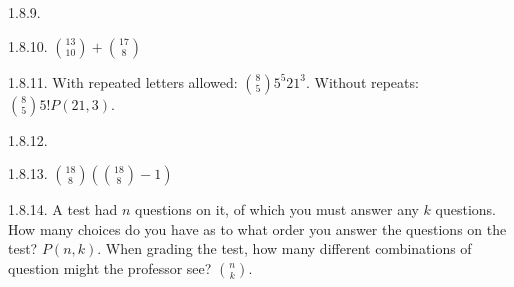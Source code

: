 \begin {itemize}
\begin{ans}{1.8.9.}
	
\end{ans}
\begin{ans}{1.8.10.}
		${13 \choose 10} + {17 \choose 8}$
	
\end{ans}
\begin{ans}{1.8.11.}
		 With repeated letters allowed: ${8 \choose 5}5^5 21^3$.  Without repeats: ${8 \choose 5}5! P(21, 3)$.
	
\end{ans}
\begin{ans}{1.8.12.}
	
\end{ans}
\begin{ans}{1.8.13.}
		 ${18 \choose 8}\left({18 \choose 8} - 1\right)$
	
\end{ans}
\begin{ans}{1.8.14.}
		 A test had $n$ questions on it, of which you must answer any $k$ questions.  How many choices do you have as to what order you answer the questions on the test?  $P(n,k)$.  When grading the test, how many different combinations of question might the professor see?  ${n \choose k}$.
	

\end{ans}
\end{itemize}
